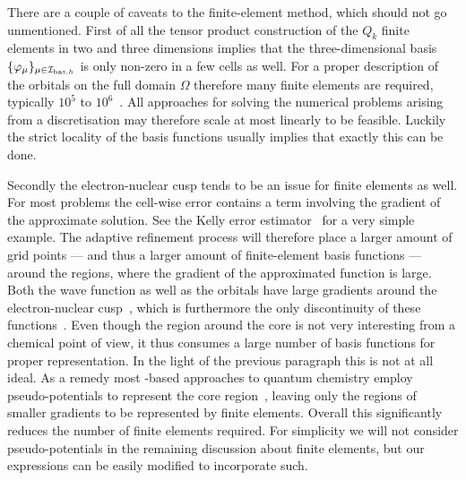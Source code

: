 There are a couple of caveats to the finite-element method,
which should not go unmentioned.
First of all the tensor product construction of the $Q_k$ finite elements
in two and three dimensions
implies that
the three-dimensional \FE basis $\{\varphi_\mu\}_{\mu\in\mathcal{I}_{\text{bas},h}}$
is only non-zero in a few cells as well.
For a proper description of the \HF orbitals
on the full domain $\Omega$
therefore many finite elements are required,
typically $10^5$ to $10^6$~\cite{Davydov2015}.
All approaches for solving the numerical problems arising from a \FE
discretisation may therefore scale at most linearly to be feasible.
Luckily the strict locality of the \FE basis functions
usually implies that exactly this can be done.

Secondly the electron-nuclear cusp tends to be an issue
for finite elements as well.
For most problems the cell-wise error contains
a term involving the gradient of the approximate solution.
See the Kelly error estimator~\cite{KellyError} for a very simple example.
The adaptive refinement process
will therefore place a larger amount of grid points
--- and thus a larger amount of finite-element basis functions ---
around the regions,
where the gradient of the approximated function is large.
Both the wave function as well as the \HF orbitals
have large gradients around the electron-nuclear cusp~\cite{Kato1957},
which is furthermore the only discontinuity of these
functions~\cite{Kato1951}.
Even though the region around the core
is not very interesting from a chemical point of view,
it thus consumes a large number of \FE basis functions
for proper representation.
In the light of the previous paragraph this is not at all ideal.
As a remedy most \FE-based approaches to quantum chemistry employ pseudo-potentials
to represent the core region~\cite{Davydov2015},
leaving only the regions of smaller gradients
to be represented by finite elements.
Overall this significantly reduces the number of finite elements required.
For simplicity we will not consider pseudo-potentials
in the remaining discussion about finite elements,
but our expressions can be easily modified to incorporate such.

